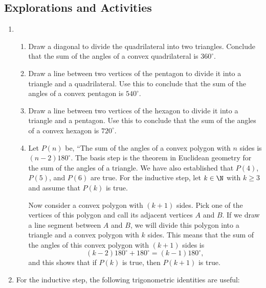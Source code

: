 \subsection*{Explorations and Activities}
\setcounter{oldenumi}{\theenumi}
\begin{enumerate} \setcounter{enumi}{\theoldenumi}
\item \begin{enumerate}
\item Draw a diagonal to divide the quadrilateral into two triangles.  Conclude that the sum of the angles of a convex quadrilateral is $360^\circ$.

\item Draw a line between two vertices of the pentagon to divide it into a triangle and a quadrilateral.  Use this to conclude that the sum of the angles of a convex pentagon is 
$540^\circ$.

\item Draw a line between two vertices of the hexagon to divide it into a triangle and a pentagon.  Use this to conclude that the sum of the angles of a convex hexagon is 
$720^\circ$.

\item Let $P(n)$ be, ``The sum of the angles of a convex polygon with $n$ sides is 
$(n - 2)180^\circ$.  The basis step is the theorem in Euclidean geometry for the sum of the angles of a triangle.  We have also established that $P(4)$, $P(5)$, and $P(6)$ are true.  For the inductive step, let $k \in \N$ with $k \geq 3$ and assume that $P(k)$ is true.

Now consider a convex polygon with $(k + 1)$ sides.  Pick one of the vertices of this polygon and call its adjacent vertices $A$ and $B$.  If we draw a line segment between $A$ and $B$, we will divide this polygon into a triangle and a convex polygon with $k$ sides.  This means that the sum of the angles of this convex polygon with $(k + 1)$ sides is
\[
(k - 2)180^\circ + 180^\circ = (k - 1) 180^\circ,
\]
and this shows that if $P(k)$ is true, then $P(k + 1)$ is true.
\end{enumerate}


\item For the inductive step, the following trigonometric identities are useful:
\end{enumerate}
